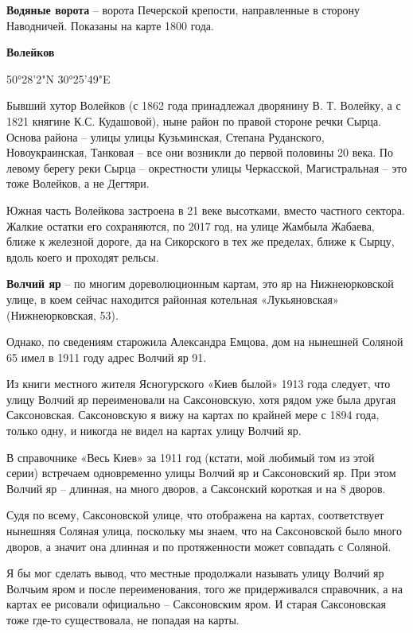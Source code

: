 \textbf{Водяные ворота} – ворота Печерской крепости, направленные в сторону Наводничей. Показаны на карте 1800 года.\\

\medskip

\textbf{Волейков}

50°28'2"N 30°25'49"E

Бывший хутор Волейков (с 1862 года принадлежал дворянину В. Т. Волейку, а с 1821 княгине К.С. Кудашовой), ныне район по правой стороне речки Сырца. Основа района – улицы улицы Кузьминская, Степана Руданского, Новоукраинская, Танковая – все они возникли до первой половины 20 века. По левому берегу реки Сырца – окрестности улицы Черкасской, Магистральная – это тоже Волейков, а не Дегтяри.

Южная часть Волейкова застроена в 21 веке высотками, вместо частного сектора. Жалкие остатки его сохраняются, по 2017 год, на улице Жамбыла Жабаева, ближе к железной дороге, да на Сикорского в тех же пределах, ближе к Сырцу, вдоль коего и проходят рельсы.\\

\medskip

\textbf{Волчий яр} – по многим  дореволюционным картам, это яр на Нижнеюрковской улице, в коем сейчас находится районная котельная «Лукьяновская» (Нижнеюрковская, 53). 

Однако, по сведениям старожила Александ\-ра Емцова, дом на нынешней Соляной 65 имел в 1911 году адрес Волчий яр 91. 

Из книги местного жителя Ясногурского «Киев былой» 1913 года следует, что улицу Волчий яр переименовали на Саксоновскую, хотя рядом уже была другая Саксоновская. Саксоновскую я вижу на картах по крайней мере с 1894 года, только одну, и никогда не видел на картах улицу Волчий яр. 

В справочнике «Весь Киев» за 1911 год (кстати, мой любимый том из этой серии) встречаем одновременно улицы Волчий яр и Саксоновский яр. При этом Волчий яр – длинная, на много дворов, а Саксонский короткая и на 8 дворов.

Судя по всему, Саксоновской улице, что отображена на картах, соответствует нынешняя Соляная улица, поскольку мы знаем, что на Саксоновской было много дворов, а значит она длинная и по протяженности может совпадать с Соляной.

Я бы мог сделать вывод, что местные продолжали называть улицу Волчий яр Волчьим яром и после переименования, того же придерживался справочник, а на картах ее рисовали официально – Саксоновским яром. И старая Саксоновская тоже где-то существовала, не попадая на карты. 

